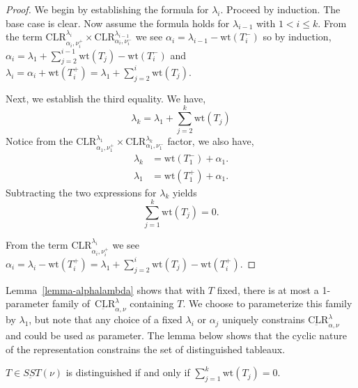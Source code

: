 \documentclass[ALCO,Unicode]{cedram}
\newcommand{\wt}{\text{wt}}
\newcommand{\CLR}{\text{CLR}}
\begin{document}
\begin{proof}
    We begin by establishing the formula for $\lambda_i$. Proceed by induction. The base case is clear. Now assume the formula holds for $\lambda_{i-1}$ with $1 < i \leq k$. From the term $\CLR^{\lambda_i}_{\alpha_i, \nu_i^+} \times \CLR^{\lambda_{i-1}}_{\alpha_i, \nu_i^-}$ we see $\alpha_i = \lambda_{i-1} - \wt(T_i^-)$ so by induction, $\alpha_i = \lambda_1 + \sum_{j=2}^{i-1}\wt(T_j) - \wt(T_i^-)$ and $\lambda_i = \alpha_i + \wt(T_i^+) = \lambda_1 + \sum_{j=2}^i\wt(T_j)$.

    Next, we establish the third equality. We have, 
    $$\lambda_k = \lambda_1 + \sum_{j=2}^{k} \wt(T_j)$$
    Notice from the $ \CLR^{\lambda_1}_{\alpha_1, \nu_1^+} \times \CLR^{\lambda_{k}}_{\alpha_1, \nu_1^-}$ factor, we also have,
    \begin{align*}
    \lambda_k &= \wt(T_1^-) + \alpha_1.\\
    \lambda_1 &= \wt(T_1^+) + \alpha_1.
    \end{align*}
    Subtracting the two expressions for $\lambda_k$ yields
    $$\sum_{j=1}^k \wt(T_j) = 0.$$
    
    From the term $\CLR^{\lambda_i}_{\alpha_i, \nu_i^+}$ we see $\alpha_i = \lambda_i - \wt(T_i^+) = \lambda_1 + \sum_{j=2}^{i} \wt(T_j) - \wt(T_i^+)$. 
\end{proof}

Lemma~\ref{lemma-alphalambda} shows that with $T$ fixed, there is at most a 1-parameter family of~$\underbar{\CLR}^\lambda_{\alpha, \nu}$ containing $T$. We choose to parameterize this family by $\lambda_1$, but note that any choice of a fixed $\lambda_i$ or $\alpha_j$ uniquely constrains  $\underbar{\CLR}^\lambda_{\alpha, \nu}$ and could be used as parameter. The lemma below shows that the cyclic nature of the representation constrains the set of distinguished tableaux.

\begin{lemma} \label{lemma-distingchar}
    $T \in \underbar{SST}(\nu)$ is distinguished if and only if $\sum_{j=1}^k \wt(T_j) = 0$.
\end{lemma}
\end{document}
